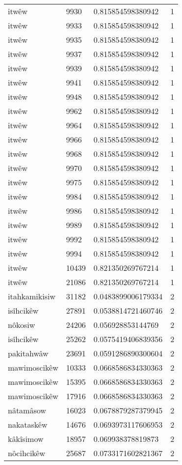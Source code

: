\begin{longtable}{llll}
itwêw & 9930 & 0.815854598380942 & 1 \\
itwêw & 9933 & 0.815854598380942 & 1 \\
itwêw & 9935 & 0.815854598380942 & 1 \\
itwêw & 9937 & 0.815854598380942 & 1 \\
itwêw & 9939 & 0.815854598380942 & 1 \\
itwêw & 9941 & 0.815854598380942 & 1 \\
itwêw & 9948 & 0.815854598380942 & 1 \\
itwêw & 9962 & 0.815854598380942 & 1 \\
itwêw & 9964 & 0.815854598380942 & 1 \\
itwêw & 9966 & 0.815854598380942 & 1 \\
itwêw & 9968 & 0.815854598380942 & 1 \\
itwêw & 9970 & 0.815854598380942 & 1 \\
itwêw & 9975 & 0.815854598380942 & 1 \\
itwêw & 9984 & 0.815854598380942 & 1 \\
itwêw & 9986 & 0.815854598380942 & 1 \\
itwêw & 9989 & 0.815854598380942 & 1 \\
itwêw & 9992 & 0.815854598380942 & 1 \\
itwêw & 9994 & 0.815854598380942 & 1 \\
itwêw & 10439 & 0.821350269767214 & 1 \\
itwêw & 21086 & 0.821350269767214 & 1 \\
itahkamikisiw & 31182 & 0.0483899006179334 & 2 \\
isîhcikêw & 27891 & 0.0538814721460746 & 2 \\
nôkosiw & 24206 & 0.056928853144769 & 2 \\
isîhcikêw & 25262 & 0.0575419406839356 & 2 \\
pakitahwâw & 23691 & 0.0591286890300604 & 2 \\
mawimoscikêw & 10333 & 0.0668586834330363 & 2 \\
mawimoscikêw & 15395 & 0.0668586834330363 & 2 \\
mawimoscikêw & 17916 & 0.0668586834330363 & 2 \\
nâtamâsow & 16023 & 0.0678879287379945 & 2 \\
nakataskêw & 14676 & 0.0693973117606953 & 2 \\
kâkîsimow & 18957 & 0.069938378819873 & 2 \\
nôcihcikêw & 25687 & 0.0733171602821367 & 2 \\

\end{longtable}
